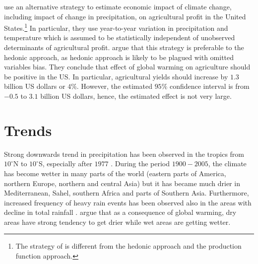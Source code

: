 \documentclass[a4paper,12pt]{article}
\begin{document}
\cite{Deschenes2007Ric} use an alternative strategy to estimate economic impact of climate change, including impact of change in precipitation, on agricultural profit in the United States.\footnote{The strategy of \cite{Deschenes2007Ric} is different from the hedonic approach and the production function approach.} In particular, they use year-to-year variation in precipitation and temperature which is assumed to be statistically independent of unobserved determinants of agricultural profit. \cite{Deschenes2007Ric} argue that this strategy is preferable to the hedonic approach, as hedonic approach is likely to be plagued with omitted variables bias. They conclude that effect of global warming on agriculture should be positive in the US. In particular, agricultural yields should increase by $1.3$ billion US dollars or $4\%$. However, the estimated $95\%$ confidence interval is from $-0.5$ to $3.1$ billion US dollars, hence, the estimated effect is not very large.


\section*{Trends}

 Strong downwards trend in precipitation has been observed in the tropics from $10^\circ$N to $10^\circ$S, especially after $1977$ \citep{IPCCtrenberth}. During the period $1900-2005$, the climate has become wetter in many parts of the world (eastern parts of America, northern Europe, northern and central Asia) but it has became much drier in Mediterranean, Sahel, southern Africa and parts of Southern Asia. Furthermore, increased frequency of heavy rain events has been observed also in the areas with decline in total rainfall \citep{IPCCtrenberth}. \cite{Trenberth2014} argue that as a consequence of global warming, dry areas have strong tendency to get drier while wet areas are getting wetter. 
 \pagebreak


\end{document}

